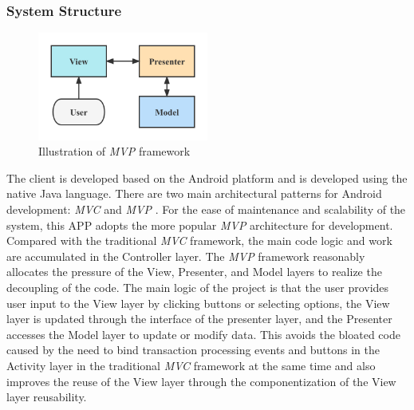 \subsubsection{System Structure}


\begin{figure}[htb]
    \centering
    \includegraphics[width=0.5\textwidth]{figures/MVP.png}
    \caption{Illustration of \textit{MVP} framework
 }\label{MVP}
\end{figure}

The client is developed based on the Android platform and is developed using the native Java language. There are two main architectural patterns for Android development: \textit{MVC} and \textit{MVP} \cite{lou2016comparison}. For the ease of maintenance and scalability of the system, this APP adopts the more popular \textit{MVP} architecture for development. Compared with the traditional \textit{MVC} framework, the main code logic and work are accumulated in the Controller layer. The \textit{MVP} framework reasonably allocates the pressure of the View, Presenter, and Model layers to realize the decoupling of the code. The main logic of the project is that the user provides user input to the View layer by clicking buttons or selecting options, the View layer is updated through the interface of the presenter layer, and the Presenter accesses the Model layer to update or modify data. This avoids the bloated code caused by the need to bind transaction processing events and buttons in the Activity layer in the traditional \textit{MVC} framework at the same time and also improves the reuse of the View layer through the componentization of the View layer reusability.


